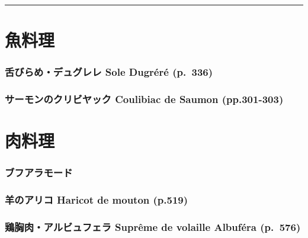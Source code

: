 \begin{center}\rule{0.5\linewidth}{\linethickness}\end{center}

\hypertarget{ux9b5aux6599ux7406}{%
\section{魚料理}\label{ux9b5aux6599ux7406}}

\hypertarget{ux820cux3073ux3089ux3081ux30c7ux30e5ux30b0ux30ecux30ec-sole-dugruxe9ruxe9-p.336}{%
\subsubsection{舌びらめ・デュグレレ Sole Dugréré
(p.~336)}\label{ux820cux3073ux3089ux3081ux30c7ux30e5ux30b0ux30ecux30ec-sole-dugruxe9ruxe9-p.336}}

\hypertarget{ux30b5ux30fcux30e2ux30f3ux306eux30afux30eaux30d3ux30e4ux30c3ux30af-coulibiac-de-saumon-pp.301-303}{%
\subsubsection{サーモンのクリビヤック Coulibiac de Saumon
(pp.301-303)}\label{ux30b5ux30fcux30e2ux30f3ux306eux30afux30eaux30d3ux30e4ux30c3ux30af-coulibiac-de-saumon-pp.301-303}}

\hypertarget{ux8089ux6599ux7406}{%
\section{肉料理}\label{ux8089ux6599ux7406}}

\hypertarget{ux30d6ux30d5ux30a2ux30e9ux30e2ux30fcux30c9}{%
\subsubsection{ブフアラモード}\label{ux30d6ux30d5ux30a2ux30e9ux30e2ux30fcux30c9}}

\hypertarget{ux7f8aux306eux30a2ux30eaux30b3-haricot-de-mouton-p.519}{%
\subsubsection{羊のアリコ Haricot de mouton
(p.519)}\label{ux7f8aux306eux30a2ux30eaux30b3-haricot-de-mouton-p.519}}

\hypertarget{ux9d8fux80f8ux8089ux30a2ux30ebux30d3ux30e5ux30d5ux30a7ux30e9-supruxeame-de-volaille-albufuxe9ra-p.576}{%
\subsubsection{鶏胸肉・アルビュフェラ Suprême de volaille Albuféra
(p.~576)}\label{ux9d8fux80f8ux8089ux30a2ux30ebux30d3ux30e5ux30d5ux30a7ux30e9-supruxeame-de-volaille-albufuxe9ra-p.576}}

